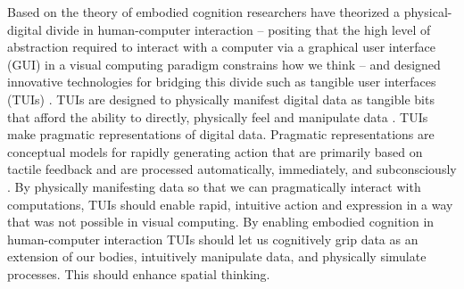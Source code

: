 \documentclass{sigchi}
\begin{document}
Based on the theory of embodied cognition
researchers have theorized a physical-digital divide in human-computer interaction --
positing that 
the high level of abstraction required to interact with a computer
via a graphical user interface (GUI) in a visual computing paradigm 
constrains how we think -- 
and designed innovative technologies for bridging this divide 
such as tangible user interfaces (TUIs) \cite{Ishii1997, Dourish2001}. 
%
%
TUIs are designed to physically manifest digital data as tangible bits 
that afford the ability to directly, physically feel and manipulate data \cite{Ishii1997}. 
%
%
TUIs make pragmatic representations of digital data. 
Pragmatic representations are conceptual models for rapidly generating action
that are primarily based on tactile feedback and are processed automatically, immediately, 
and subconsciously \cite{Jeannerod1997}. 
%
By physically manifesting data so that we can pragmatically
interact with computations,  
TUIs should enable rapid, intuitive action and expression 
in a way that was not possible in visual computing. 
By enabling embodied cognition in human-computer interaction 
TUIs should let us cognitively grip data as an extension of our bodies, 
intuitively manipulate data, and physically simulate processes. 
This should enhance spatial thinking.
\end{document}
